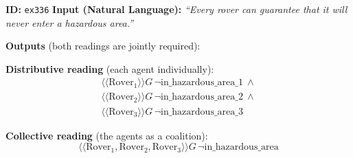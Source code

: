 \begin{dataset}[t]
\caption{Quantifier scope ambiguity example}
\label{ds:qsa_example}
\begin{algorithmic}[1]
\STATE \textbf{ID:} \texttt{ex336}
\STATE \textbf{Input (Natural Language):}
\STATE \quad \textit{``Every rover can guarantee that it will never enter a hazardous area.''}

\STATE \textbf{Outputs} (both readings are jointly required):
\STATE \quad
\begin{minipage}[t]{0.92\linewidth}
\textbf{Distributive reading} (each agent individually):
\[
\begin{array}{l}
\langle\!\langle \text{Rover}_1 \rangle\!\rangle G\,\neg\text{in\_hazardous\_area\_1} \ \wedge\\
\langle\!\langle \text{Rover}_2 \rangle\!\rangle G\,\neg\text{in\_hazardous\_area\_2} \ \wedge\\
\langle\!\langle \text{Rover}_3 \rangle\!\rangle G\,\neg\text{in\_hazardous\_area\_3}
\end{array}
\]
\end{minipage}

\STATE \quad
\begin{minipage}[t]{0.92\linewidth}
\textbf{Collective reading} (the agents as a coalition):
\[
\langle\!\langle \text{Rover}_1,\text{Rover}_2,\text{Rover}_3 \rangle\!\rangle G\,\neg\text{in\_hazardous\_area}
\]
\end{minipage}
\end{algorithmic}
\end{dataset}

